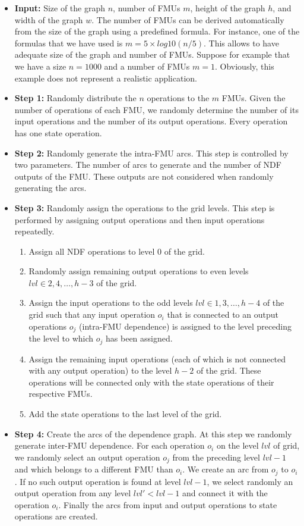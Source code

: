 \begin{itemize}
\item \textbf{Input:} Size of the graph $n$, number of FMUs $m$, height of the graph $h$, and width of the graph $w$. The number of FMUs can be derived automatically from the size of the graph using a predefined formula. For instance, one of the formulas that we have used is $ m = 5 \times log10(n/5)$. This allows to have adequate size of the graph and number of FMUs. Suppose for example that we have a size $n = 1000$ and a number of FMUs $m = 1$. Obviously, this example does not represent a realistic application. 
\item \textbf{Step 1:} Randomly distribute the $n$ operations to the $m$ FMUs. Given the number of operations of each FMU, we randomly determine the number of its input operations and the number of its output operations. Every operation has one state operation.
\item \textbf{Step 2:} Randomly generate the intra-FMU arcs. This step is controlled by two parameters.  The number of arcs to generate and the number of NDF outputs of the FMU. These outputs are not considered when randomly generating the arcs.
\item \textbf{Step 3:} Randomly assign the operations to the grid levels. This step is performed by assigning output operations and then input operations repeatedly.
\begin{enumerate}
\item Assign all NDF operations to level $0$ of the grid.
\item Randomly assign remaining output operations to even levels $lvl \in {2, 4, \ldots, h-3} $ of the grid.
\item Assign the input operations to the odd levels $lvl \in {1, 3, \ldots, h-4} $ of the grid such that any input operation $o_i$ that is connected to an output operations $o_j$ (intra-FMU dependence) is assigned to the level preceding the level to which $o_j$ has been assigned. 
\item Assign the remaining input operations (each of which is not connected with any output operation) to the level $h-2$ of the grid. These operations will be connected only with the state operations of their respective FMUs.
\item Add the state operations to the last level of the grid.
\end{enumerate}
\item \textbf{Step 4:} Create the arcs of the dependence graph. At this step we randomly generate inter-FMU dependence. For each operation $o_i$ on the level $lvl$ of grid, we randomly select an output operation $o_j$ from the preceding level $lvl-1$ and which belongs to a different FMU than $o_i$. We create an arc from $o_j$ to $o_i$. If no such output operation is found at level $lvl-1$, we select randomly an output operation from any level $lvl' < lvl-1$ and connect it with the operation $o_i$. Finally the arcs from input and output operations to state operations are created. 
\end{itemize}

